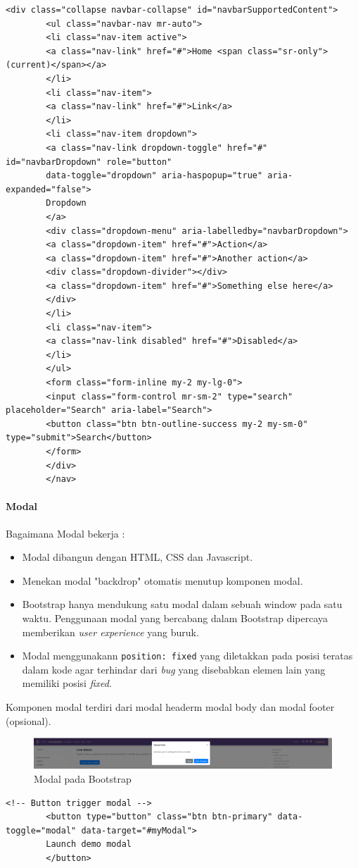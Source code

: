 \documentclass[a4paper,twoside]{article}
\begin{document}
\begin{enumerate}
\begin{lstlisting}[frame=single, basicstyle=\tiny]
		<div class="collapse navbar-collapse" id="navbarSupportedContent">
		<ul class="navbar-nav mr-auto">
		<li class="nav-item active">
		<a class="nav-link" href="#">Home <span class="sr-only">(current)</span></a>
		</li>
		<li class="nav-item">
		<a class="nav-link" href="#">Link</a>
		</li>
		<li class="nav-item dropdown">
		<a class="nav-link dropdown-toggle" href="#" id="navbarDropdown" role="button" 
		data-toggle="dropdown" aria-haspopup="true" aria-expanded="false">
		Dropdown
		</a>
		<div class="dropdown-menu" aria-labelledby="navbarDropdown">
		<a class="dropdown-item" href="#">Action</a>
		<a class="dropdown-item" href="#">Another action</a>
		<div class="dropdown-divider"></div>
		<a class="dropdown-item" href="#">Something else here</a>
		</div>
		</li>
		<li class="nav-item">
		<a class="nav-link disabled" href="#">Disabled</a>
		</li>
		</ul>
		<form class="form-inline my-2 my-lg-0">
		<input class="form-control mr-sm-2" type="search" placeholder="Search" aria-label="Search">
		<button class="btn btn-outline-success my-2 my-sm-0" type="submit">Search</button>
		</form>
		</div>
		</nav>
		\end{lstlisting}
		
		\paragraph{Modal} \par
		Bagaimana Modal bekerja :
		\begin{itemize}
			\item Modal dibangun dengan HTML, CSS dan Javascript. 
			\item Menekan modal "backdrop" otomatis menutup komponen modal.
			\item Bootstrap hanya mendukung satu modal dalam sebuah window pada satu waktu. Penggunaan modal yang bercabang dalam Bootstrap dipercaya memberikan \textit{user experience} yang buruk.
			\item Modal menggunakann \texttt{position: fixed} yang diletakkan pada posisi teratas dalam kode agar terhindar dari \textit{bug} yang disebabkan elemen lain yang memiliki posisi \textit{fixed}. 
		\end{itemize}
		Komponen modal terdiri dari modal headerm modal body dan modal footer (opsional).
		\begin{figure} [H]
			\centering  
			\includegraphics[scale=0.5]{livemodal_bootstrap.png}  
			\caption{Modal pada Bootstrap} 
		\end{figure}
		\begin{lstlisting}[frame=single, basicstyle=\tiny] 
		<!-- Button trigger modal -->
		<button type="button" class="btn btn-primary" data-toggle="modal" data-target="#myModal">
		Launch demo modal
		</button>
		

\end{lstlisting}
\end{enumerate}
\end{document}
